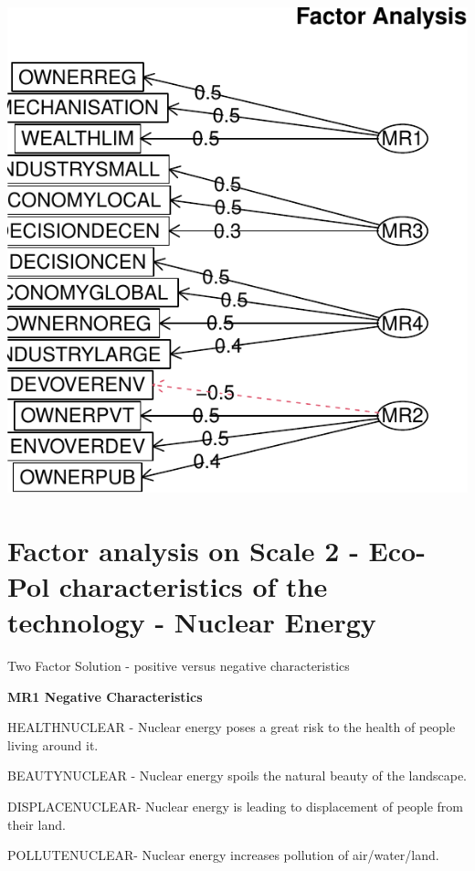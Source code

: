 \documentclass[
]{article}
\begin{document}
\includegraphics{module2PCAs_files/figure-latex/unnamed-chunk-9-1.pdf}

\newpage

\hypertarget{factor-analysis-on-scale-2---eco-pol-characteristics-of-the-technology---nuclear-energy}{%
\section{Factor analysis on Scale 2 - Eco-Pol characteristics of the
technology - Nuclear
Energy}\label{factor-analysis-on-scale-2---eco-pol-characteristics-of-the-technology---nuclear-energy}}

Two Factor Solution - positive versus negative characteristics

\textbf{MR1 Negative Characteristics}

HEALTHNUCLEAR - Nuclear energy poses a great risk to the health of
people living around it.

BEAUTYNUCLEAR - Nuclear energy spoils the natural beauty of the
landscape.

DISPLACENUCLEAR- Nuclear energy is leading to displacement of people
from their land.

POLLUTENUCLEAR- Nuclear energy increases pollution of air/water/land.
\end{document}

